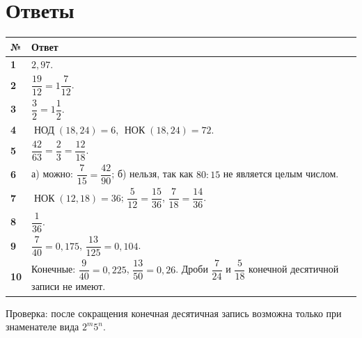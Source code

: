 \documentclass[a4paper,12pt]{article}
\newcommand{\nodop}{\mathop{\text{НОД}}\nolimits}
\newcommand{\nokop}{\mathop{\text{НОК}}\nolimits}
\begin{document}
\section*{Ответы}
\renewcommand{\arraystretch}{1.45}
\begin{center}
\begin{tabularx}{\linewidth}{@{}>{\bfseries}p{12mm}X@{}}
\toprule
№ & Ответ \\
\midrule
1 & \(2{,}97\). \\
2 & \(\dfrac{19}{12}=1\dfrac7{12}\). \\
3 & \(\dfrac32=1\dfrac12\). \\
4 & \(\nodop(18,24)=6\), \(\nokop(18,24)=72\). \\
5 & \(\dfrac{42}{63}=\dfrac23=\dfrac{12}{18}\). \\
6 & а) можно: \(\dfrac7{15}=\dfrac{42}{90}\); б) нельзя, так как \(80:15\) не является целым числом. \\
7 & \(\nokop(12,18)=36\); \(\dfrac5{12}=\dfrac{15}{36}\), \(\dfrac7{18}=\dfrac{14}{36}\). \\
8 & \(\dfrac1{36}\). \\
9 & \(\dfrac7{40}=0{,}175\), \(\dfrac{13}{125}=0{,}104\). \\
10 & Конечные: \(\dfrac9{40}=0{,}225\), \(\dfrac{13}{50}=0{,}26\). Дроби \(\dfrac7{24}\) и \(\dfrac5{18}\) конечной десятичной записи не имеют. \\
\bottomrule
\end{tabularx}
\end{center}

\vfill
{\small\color{softgray}Проверка: после сокращения конечная десятичная запись возможна только при знаменателе вида \(2^m5^n\).}
\end{document}
